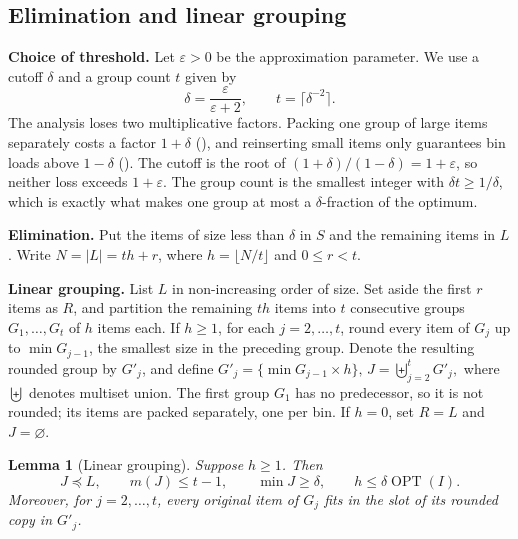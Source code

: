 \documentclass[11pt,a4paper,onecolumn]{article}
\theoremstyle{plain}
\newtheorem{lemma}[theorem]{Lemma}
\theoremstyle{definition}
\theoremstyle{remark}
\DeclareMathOperator{\OPT}{OPT}
\begin{document}
\subsection{Elimination and linear grouping}
\label{subsec:dlvl-grouping}

\smallskip
\noindent\textbf{Choice of threshold.}
Let $\varepsilon>0$ be the approximation parameter. We use a cutoff
$\delta$ and a group count $t$ given by
\[
  \delta=\frac{\varepsilon}{\varepsilon+2},\qquad
  t=\lceil\delta^{-2}\rceil .
\]
The analysis loses two multiplicative factors. Packing one group of
large items separately costs a factor $1+\delta$
(), and reinserting small items only guarantees
bin loads above $1-\delta$ (). The cutoff is the
root of $(1+\delta)/(1-\delta)=1+\varepsilon$, so neither loss exceeds
$1+\varepsilon$. The group count is the smallest integer with
$\delta t\ge 1/\delta$, which is exactly what makes one group at most a
$\delta$-fraction of the optimum.

\smallskip
\noindent\textbf{Elimination.}
Put the items of size less than $\delta$ in $S$ and the remaining items
in $L$. Write $N=|L|=th+r$, where $h=\lfloor N/t\rfloor$ and
$0\le r<t$.

\smallskip
\noindent\textbf{Linear grouping.}
List $L$ in non-increasing order of size. Set aside the first $r$ items
as $R$, and partition the remaining $th$ items into $t$ consecutive
groups $G_1,\ldots,G_t$ of $h$ items each. If $h\ge1$, for each
$j=2,\ldots,t$, round every item of $G_j$ up to $\min G_{j-1}$,
the smallest size in the preceding group. Denote the resulting
rounded group by $G'_j$, and define $G'_j=\{\min G_{j-1}\times h\},\, J=\biguplus_{j=2}^{t}G'_j,$
where $\biguplus$ denotes multiset union. The first group $G_1$
has no predecessor, so it is not rounded; its items
are packed separately, one per bin. If $h=0$, set $R=L$ and
$J=\varnothing$.

\begin{lemma}[Linear grouping]\label{lem:dlvl-grouping}
Suppose $h\ge1$. Then
\[
  J\preceq L,\qquad m(J)\le t-1,\qquad
  \min J\ge\delta,\qquad h\le\delta\OPT(I).
\]
Moreover, for $j=2,\ldots,t$, every original item of $G_j$ fits in
the slot of its rounded copy in $G'_j$.
\end{lemma}
\end{document}
